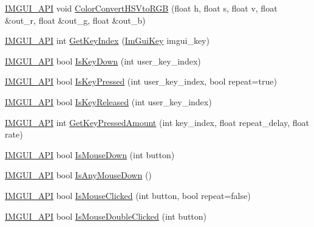 \begin{DoxyCompactItemize}
\mbox{\hyperlink{imgui_8h_a43829975e84e45d1149597467a14bbf5}{I\+M\+G\+U\+I\+\_\+\+A\+PI}} void \mbox{\hyperlink{namespace_im_gui_a074427678b3e56378b7dcdefa4c8b5c7}{Color\+Convert\+H\+S\+Vto\+R\+GB}} (float h, float s, float v, float \&out\+\_\+r, float \&out\+\_\+g, float \&out\+\_\+b)
\item 
\mbox{\hyperlink{imgui_8h_a43829975e84e45d1149597467a14bbf5}{I\+M\+G\+U\+I\+\_\+\+A\+PI}} int \mbox{\hyperlink{namespace_im_gui_a6cf235f0d0787d51a93f6d90e0bdff9b}{Get\+Key\+Index}} (\mbox{\hyperlink{imgui_8h_a1671ca739cf1384a8cc268758f27b4e7}{Im\+Gui\+Key}} imgui\+\_\+key)
\item 
\mbox{\hyperlink{imgui_8h_a43829975e84e45d1149597467a14bbf5}{I\+M\+G\+U\+I\+\_\+\+A\+PI}} bool \mbox{\hyperlink{namespace_im_gui_a633d848504c89e7756ddd33474bc78d2}{Is\+Key\+Down}} (int user\+\_\+key\+\_\+index)
\item 
\mbox{\hyperlink{imgui_8h_a43829975e84e45d1149597467a14bbf5}{I\+M\+G\+U\+I\+\_\+\+A\+PI}} bool \mbox{\hyperlink{namespace_im_gui_a83331a8afa5316bc98ed9c98b151ac01}{Is\+Key\+Pressed}} (int user\+\_\+key\+\_\+index, bool repeat=true)
\item 
\mbox{\hyperlink{imgui_8h_a43829975e84e45d1149597467a14bbf5}{I\+M\+G\+U\+I\+\_\+\+A\+PI}} bool \mbox{\hyperlink{namespace_im_gui_a3fb25247181c5c292fe4f932bd20de88}{Is\+Key\+Released}} (int user\+\_\+key\+\_\+index)
\item 
\mbox{\hyperlink{imgui_8h_a43829975e84e45d1149597467a14bbf5}{I\+M\+G\+U\+I\+\_\+\+A\+PI}} int \mbox{\hyperlink{namespace_im_gui_ad94a09fc01052f02fe11bec5a3c11275}{Get\+Key\+Pressed\+Amount}} (int key\+\_\+index, float repeat\+\_\+delay, float rate)
\item 
\mbox{\hyperlink{imgui_8h_a43829975e84e45d1149597467a14bbf5}{I\+M\+G\+U\+I\+\_\+\+A\+PI}} bool \mbox{\hyperlink{namespace_im_gui_a8ddf4d05de8ab8b9aa70906a22a9973e}{Is\+Mouse\+Down}} (int button)
\item 
\mbox{\hyperlink{imgui_8h_a43829975e84e45d1149597467a14bbf5}{I\+M\+G\+U\+I\+\_\+\+A\+PI}} bool \mbox{\hyperlink{namespace_im_gui_a0ce3f28b6b09f031e12e7a81708c043a}{Is\+Any\+Mouse\+Down}} ()
\item 
\mbox{\hyperlink{imgui_8h_a43829975e84e45d1149597467a14bbf5}{I\+M\+G\+U\+I\+\_\+\+A\+PI}} bool \mbox{\hyperlink{namespace_im_gui_a22b689cf4cf519590c2e2ad4f5462f29}{Is\+Mouse\+Clicked}} (int button, bool repeat=false)
\item 
\mbox{\hyperlink{imgui_8h_a43829975e84e45d1149597467a14bbf5}{I\+M\+G\+U\+I\+\_\+\+A\+PI}} bool \mbox{\hyperlink{namespace_im_gui_a0d39701e7a0d7629e1b96b68e935542e}{Is\+Mouse\+Double\+Clicked}} (int button)

\end{DoxyCompactItemize}
